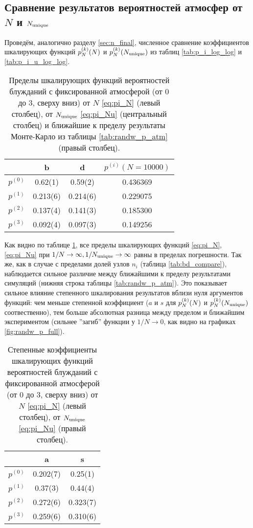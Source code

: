 \subsection{Сравнение результатов вероятностей атмосфер от $N$ и $N_{\textup{unique}}$}

Проведём, аналогично разделу \ref{sec:n_final}, численное сравнение коэффициентов шкалирующих функций $p^{(k)}_N(N)$ и $p^{(k)}_N(N_{\textup{unique}})$ из таблиц \ref{tab:p_i_log_log} и \ref{tab:p_i_u_log_log}.

\begin{table}[h]
\centering
\begin{tabular}{|c|c|c|c|}
\hline
 & b & d & $p^{(i)}(N=10000)$ \\ \hline
$p^{(0)}$ &  0.62(1) & 0.59(2) &  0.436369\\ \hline
$p^{(1)}$ & 0.213(6) & 0.214(6) & 0.229075\\ \hline
$p^{(2)}$ & 0.137(4) & 0.141(3) & 0.185300\\ \hline
$p^{(3)}$ & 0.092(4) & 0.097(3) & 0.149256\\ \hline
\end{tabular}
\caption{Пределы шкалирующих функций вероятностей блужданий с фиксированной атмосферой (от 0 до 3, сверху вниз) от $N$ \eqref{eq:pi_N} (левый столбец), от $N_{\textup{unique}}$ \eqref{eq:pi_Nu} (центральный столбец) и ближайшие к пределу результаты Монте-Карло из таблицы \ref{tab:randw_p_atm} (правый столбец).}
\label{tab:bd_atm_compare}
\end{table}

Как видно по таблице \ref{tab:bd_atm_compare}, все пределы шкалирующих функций \eqref{eq:pi_N}, \eqref{eq:pi_Nu} при $1/N \to \infty, 1/N_{\textup{unique}} \to \infty$ равны в пределах погрешности.
Так же, как в случае с пределами долей узлов $n_i$ (таблица \ref{tab:bd_compare}), наблюдается сильное различие между ближайшими к пределу результатами симуляций (нижняя строка таблицы \ref{tab:randw_p_atm}).
Это показывает сильное влияние степенного шкалирования результатов вблизи нуля аргументов функций: чем меньше степенной коэффициент ($a$ и $s$ для $p^{(k)}_N(N)$ и $p^{(k)}_N(N_{\textup{unique}})$ соотвественно), тем больше абсолютная разница между пределом и ближайшим экспериментом (сильнее ''загиб'' функции у $1/N \to 0$, как видно на графиках \ref{fig:randw_p_full}).

\begin{table}[h]
\centering
\begin{tabular}{|c|c|c|}
\hline
 & a & s \\ \hline
$p^{(0)}$ & 0.202(7) & 0.25(1) \\ \hline
$p^{(1)}$ & 0.37(3) & 0.44(4) \\ \hline
$p^{(2)}$ & 0.272(6) & 0.323(7) \\ \hline
$p^{(3)}$ & 0.259(6) & 0.310(6) \\ \hline
\end{tabular}
\caption{Степенные коэффициенты шкалирующих функций вероятностей блужданий с фиксированной атмосферой (от 0 до 3, сверху вниз) от $N$ \eqref{eq:pi_N} (левый столбец), от $N_{\textup{unique}}$ \eqref{eq:pi_Nu} (правый столбец).}
\label{tab:as_atm_compare}
\end{table}

